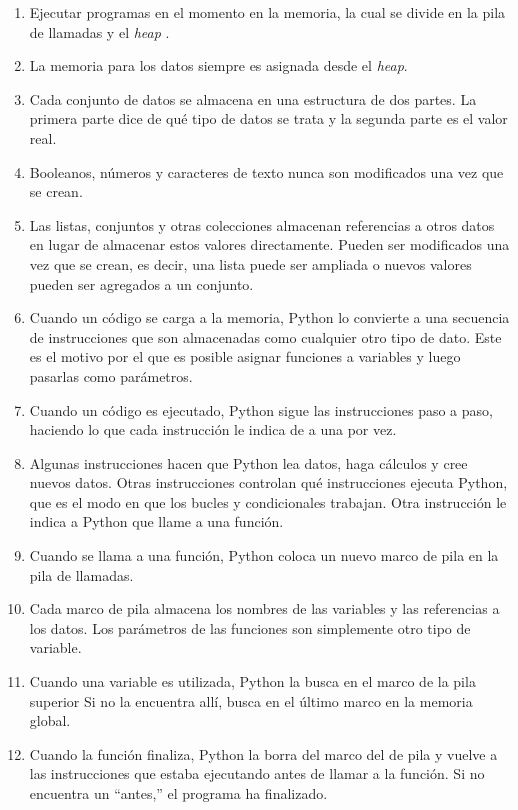 \begin{enumerate}

\item
Ejecutar programas en el momento en la memoria,
la cual se divide en la pila de llamadas y el \emph{heap}  .

\item
  La memoria para los datos siempre es asignada desde el \emph{heap}. 

\item
Cada conjunto de datos se almacena en una estructura de dos partes.
La primera parte dice de qué tipo de datos se trata
y la segunda parte es el valor real.

  \item
  Booleanos, números y caracteres de texto nunca son modificados una vez que se crean. 

\item
Las listas, conjuntos y otras colecciones almacenan referencias a otros datos
en lugar de almacenar estos valores directamente.
Pueden ser modificados una vez que se crean,
es decir, una lista puede ser ampliada o nuevos valores pueden ser agregados a un conjunto.
  
\item
Cuando un código se carga a la memoria,
Python lo convierte a una secuencia de instrucciones
que son almacenadas como cualquier otro tipo de dato.
Este es el motivo por el que es posible asignar funciones a variables
y luego pasarlas como parámetros.

\item
Cuando un código es ejecutado,
Python sigue las instrucciones paso a paso,
haciendo lo que cada instrucción le indica de a una por vez.

\item
  Algunas instrucciones hacen que Python lea datos,
haga cálculos
y cree nuevos datos.
Otras instrucciones controlan qué instrucciones ejecuta Python,
que es el modo en que los bucles y condicionales trabajan.
Otra instrucción le indica a Python que llame a una función.

\item
  Cuando se llama a una función,
Python coloca un nuevo marco de pila en la pila de llamadas.

\item
  Cada marco de pila almacena los nombres de las variables y las referencias a los datos.
Los parámetros de las funciones son simplemente otro tipo de variable.

\item
Cuando una variable es utilizada,
Python la busca en el marco de la pila superior
Si no la encuentra allí, busca en el último marco en la memoria global.
 
\item
Cuando la función finaliza, 
Python la borra del marco del de pila y vuelve
a las instrucciones que estaba ejecutando antes de llamar a la función.
Si no encuentra un ``antes,''
  el programa ha finalizado.

\end{enumerate}

